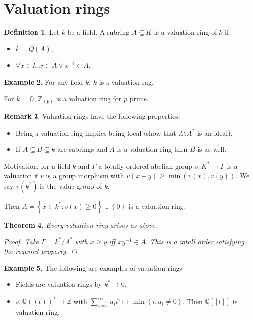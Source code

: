 \documentclass{article}
\newcommand{\Z}{\mathbb{Z}}
\newcommand{\Q}{\mathbb{Q}}
\newcommand{\set}[1]{\left\{#1\right\}}
\newcommand{\setwith}[2]{\left\{#1:#2\right\}}
\newtheorem{theorem}{Theorem}[section]
\theoremstyle{definition}
\newtheorem{definition}[theorem]{Definition}
\newtheorem{remark}[theorem]{Remark}
\newtheorem{example}[theorem]{Example}
\begin{document}
\section{Valuation rings}
\begin{definition}
    Let \(k\) be a field. A subring \(A\subseteq K\) is a valuation ring of
    \(k\) if
    \begin{itemize}
        \item \(k=Q(A)\),
        \item \(\forall x\in k, x\in A\vee x^{-1}\in A\).
    \end{itemize}
\end{definition}

\begin{example}
    For any field \(k\), \(k\) is a valuation rng.

    For \(k=\Q\), \(\Z_{(p)}\) is a valuation ring for \(p\) prime.
\end{example}

\begin{remark}
    Valuation rings have the following properties:
    \begin{itemize}
        \item Being a valuation ring implies being local (show that \(A\setminus A^{*}\)
              is an ideal).
        \item If \(A\subseteq B\subseteq k\) are subrings and \(A\) is a
              valuation ring then \(B\) is as well.
    \end{itemize}

    Motivation: for a field \(k\) and \(\Gamma\) a totally ordered abelian group
    \(v:K^{*}\to\Gamma\) is a valuation if \(v\) is a group morphism with
    \(v(x+y)\geq\min(v(x),v(y))\). We say \(v(k^{*})\) is the value group of
    \(k\).

    Then \(A=\setwith{x\in k^{*}}{v(x)\geq 0}\cup\set{0}\) is a valuation ring.
\end{remark}

\begin{theorem}
    Every valuation ring arises as above.

    \begin{proof}
        Take \(\Gamma=k^{*}/A^{*}\) with \(\overline{x}\geq\overline{y}\) iff
        \(xy^{-1}\in A\). This is a totall order satisfying the required
        property.
    \end{proof}
\end{theorem}

\begin{example}
    The following are examples of valuation rings

    \begin{itemize}
        \item Fields are valuation rings by \(k^{*}\to 0\).
        \item \(v:\Q((t))^{*}\to\Z\) with \(\sum_{i=d}^{\infty}a_{i}t^{i}\mapsto
              \min\setwith{i}{a_{i}\neq 0}\). Then \(\Q[[t]]\) is valuation
              ring.
    \end{itemize}
\end{example}
\end{document}
